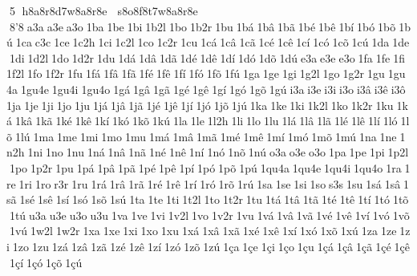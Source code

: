 5  h8a8r8d7w8a8r8e   s8o8f8t7w8a8r8e  8'8 a3a a3e a3o 1ba 1be 1bi 1b2l 1bo 1b2r 1bu 1bá 1bâ 1bã 1bé 1bê 1bí 1bó 1bõ 1bú 1ca c3c 1ce 1c2h 1ci 1c2l 1co 1c2r 1cu 1cá 1câ 1cã 1cé 1cê 1cí 1có 1cõ 1cú 1da 1de 1di 1d2l 1do 1d2r 1du 1dá 1dâ 1dã 1dé 1dê 1dí 1dó 1dõ 1dú e3a e3e e3o 1fa 1fe 1fi 1f2l 1fo 1f2r 1fu 1fá 1fâ 1fã 1fé 1fê 1fí 1fó 1fõ 1fú 1ga 1ge 1gi 1g2l 1go 1g2r 1gu 1gu4a 1gu4e 1gu4i 1gu4o 1gá 1gâ 1gã 1gé 1gê 1gí 1gó 1gõ 1gú i3a i3e i3i i3o i3â i3ê i3ô 1ja 1je 1ji 1jo 1ju 1já 1jâ 1jã 1jé 1jê 1jí 1jó 1jõ 1jú 1ka 1ke 1ki 1k2l 1ko 1k2r 1ku 1ká 1kâ 1kã 1ké 1kê 1kí 1kó 1kõ 1kú 1la 1le 1l2h 1li 1lo 1lu 1lá 1lâ 1lã 1lé 1lê 1lí 1ló 1lõ 1lú 1ma 1me 1mi 1mo 1mu 1má 1mâ 1mã 1mé 1mê 1mí 1mó 1mõ 1mú 1na 1ne 1n2h 1ni 1no 1nu 1ná 1nâ 1nã 1né 1nê 1ní 1nó 1nõ 1nú o3a o3e o3o 1pa 1pe 1pi 1p2l 1po 1p2r 1pu 1pá 1pâ 1pã 1pé 1pê 1pí 1pó 1põ 1pú 1qu4a 1qu4e 1qu4i 1qu4o 1ra 1re 1ri 1ro r3r 1ru 1rá 1râ 1rã 1ré 1rê 1rí 1ró 1rõ 1rú 1sa 1se 1si 1so s3s 1su 1sá 1sâ 1sã 1sé 1sê 1sí 1só 1sõ 1sú 1ta 1te 1ti 1t2l 1to 1t2r 1tu 1tá 1tâ 1tã 1té 1tê 1tí 1tó 1tõ 1tú u3a u3e u3o u3u 1va 1ve 1vi 1v2l 1vo 1v2r 1vu 1vá 1vâ 1vã 1vé 1vê 1ví 1vó 1võ 1vú 1w2l 1w2r 1xa 1xe 1xi 1xo 1xu 1xá 1xâ 1xã 1xé 1xê 1xí 1xó 1xõ 1xú 1za 1ze 1zi 1zo 1zu 1zá 1zâ 1zã 1zé 1zê 1zí 1zó 1zõ 1zú 1ça 1çe 1çi 1ço 1çu 1çá 1çâ 1çã 1çé 1çê 1çí 1çó 1çõ 1çú